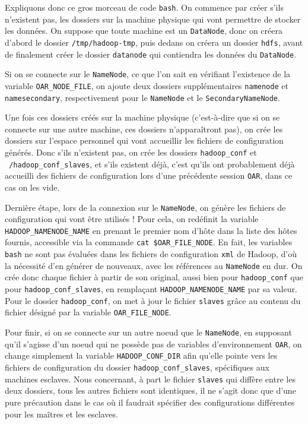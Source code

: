 \par Expliquons donc ce gros morceau de code \texttt{bash}. On commence par créer s'ils n'existent pas, les dossiers sur la machine physique qui vont permettre de stocker les données. On suppose que toute machine est un \texttt{DataNode}, donc on créera d'abord le dossier \texttt{/tmp/hadoop-tmp}, puis dedans on créera un dossier \texttt{hdfs}, avant de finalement créer le dossier \texttt{datanode} qui contiendra les données du \texttt{DataNode}.
\par Si on se connecte sur le \texttt{NameNode}, ce que l'on sait en vérifiant l'existence de la variable \texttt{OAR\_NODE\_FILE}, on ajoute deux dossiers supplémentaires \texttt{namenode} et \texttt{namesecondary}, respectivement pour le \texttt{NameNode} et le \texttt{SecondaryNameNode}.
\par Une fois ces dossiers créés sur la machine physique (c'est-à-dire que si on se connecte sur une autre machine, ces dossiers n'apparaîtront pas), on crée les dossiers sur l'espace personnel qui vont accueillir les fichiers de configuration générés. Donc s'ils n'existent pas, on crée les dossiers \texttt{hadoop\_conf} et \texttt{~/hadoop\_conf\_slaves}, et s'ils existent déjà, c'est qu'ils ont probablement déjà accueilli des fichiers de configuration lors d'une précédente session \texttt{OAR}, dans ce cas on les vide.
\par Dernière étape, lors de la connexion sur le \texttt{NameNode}, on génère les fichiers de configuration qui vont être utilisés !
Pour cela, on redéfinit la variable \texttt{HADOOP\_NAMENODE\_NAME} en prenant le premier nom d'hôte dans la liste des hôtes fournis, accessible via la commande \texttt{cat \$OAR\_FILE\_NODE}. En fait, les variables \texttt{bash} ne sont pas évaluées dans les fichiers de configuration \texttt{xml} de Hadoop, d'où la nécessité d'en générer de nouveaux, avec les références au \texttt{NameNode} en dur. On crée donc chaque fichier à partir de son original, aussi bien pour \texttt{hadoop\_conf} que pour \texttt{hadoop\_conf\_slaves}, en remplaçant \texttt{HADOOP\_NAMENODE\_NAME} par sa valeur. Pour le dossier \texttt{hadoop\_conf}, on met à jour le fichier \texttt{slaves} grâce au contenu du fichier désigné par la variable \texttt{OAR\_FILE\_NODE}.

\par Pour finir, si on se connecte sur un autre noeud que le \texttt{NameNode}, en supposant qu'il s'agisse d'un noeud qui ne possède pas de variables d'environnement \texttt{OAR}, on change simplement la variable \texttt{HADOOP\_CONF\_DIR} afin qu'elle pointe vers les fichiers de configuration du dossier \texttt{hadoop\_conf\_slaves}, spécifiques aux machines esclaves. Nous concernant, à part le fichier \texttt{slaves} qui diffère entre les deux dossiers, tous les autres fichiers sont identiques, il ne s'agit donc que d'une pure précaution dans le cas où il faudrait spécifier des configurations différentes pour les maîtres et les esclaves.

